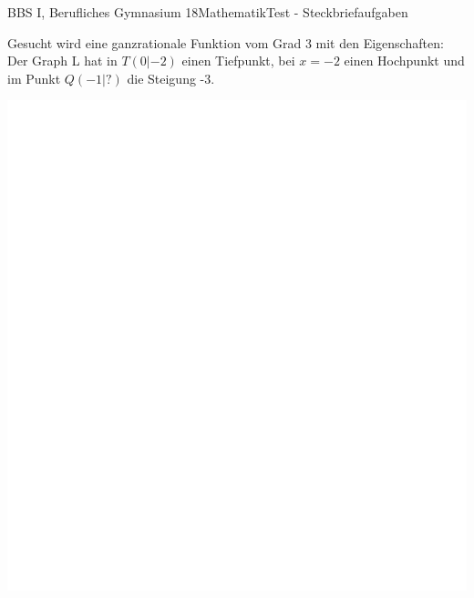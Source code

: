 \documentclass[oneside,openany,headings=optiontotoc,11pt,numbers=noenddot]{scrreprt}
\begin{document}
		\begin{worksheet}{BBS I, Berufliches Gymnasium 18}{Mathematik}{Test - Steckbriefaufgaben}
			\begin{framed}
				\noindent
				Gesucht wird eine ganzrationale Funktion vom Grad 3 mit den Eigenschaften:\\
				Der Graph L hat in \(T(0|-2)\) einen Tiefpunkt, bei \(x = -2\) einen Hochpunkt und im Punkt \(Q(-1|?)\) die Steigung -3.\\
				\par\noindent
				\includegraphics[width=1.1\textwidth]{../../empty.jpg}\\
			\end{framed}
		\end{worksheet}
\end{document}
